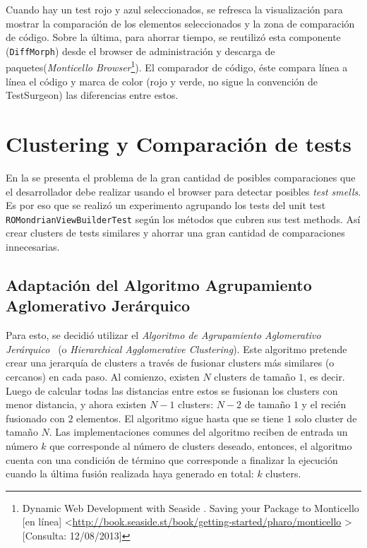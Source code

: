 \par Cuando hay un test rojo y azul seleccionados, se refresca la visualización para mostrar la comparación de los elementos seleccionados y la zona de comparación de código. Sobre la última, para ahorrar tiempo, se reutilizó esta componente ({\tt DiffMorph}) desde el browser de administración y descarga de paquetes(\emph{Monticello Browser}\footnote{Dynamic Web Development with Seaside . Saving your Package to Monticello [en línea] \textless \url{http://book.seaside.st/book/getting-started/pharo/monticello} \textgreater [Consulta: 12/08/2013] }). El comparador de código, éste compara línea a línea el código y marca de color (rojo y verde, no sigue la convención de TestSurgeon) las diferencias entre estos. 
\section{Clustering y Comparación de tests}

\par En la  se presenta el problema de la gran cantidad de posibles comparaciones que el desarrollador debe realizar usando el browser para detectar posibles \emph{test smells}. Es por eso que se realizó un experimento agrupando los tests del unit test {\tt ROMondrianViewBuilderTest} según los métodos que cubren sus test methods. Así crear clusters de tests similares y ahorrar una gran cantidad de comparaciones innecesarias.

\subsection{Adaptación del Algoritmo Agrupamiento Aglomerativo Jerárquico}

\par Para esto, se decidió utilizar el \emph{Algoritmo de Agrupamiento Aglomerativo Jerárquico}~\cite{defays1977efficient,sibson1973slink} (o \emph{Hierarchical Agglomerative Clustering}). Este algoritmo pretende crear una jerarquía de clusters a través de fusionar clusters más similares (o cercanos) en cada paso. Al comienzo, existen $N$ clusters de tamaño $1$, es decir. Luego de calcular todas las distancias entre estos se fusionan los clusters con menor distancia, y ahora existen $N-1$ clusters: $N-2$ de tamaño $1$ y el recién fusionado con $2$ elementos. El algoritmo sigue hasta que se tiene $1$ solo cluster de tamaño $N$. Las implementaciones comunes del algoritmo reciben de entrada un número $k$ que corresponde al número de clusters deseado, entonces, el algoritmo cuenta con una condición de término que corresponde a finalizar la ejecución cuando la última fusión realizada haya generado en total: $k$ clusters.

